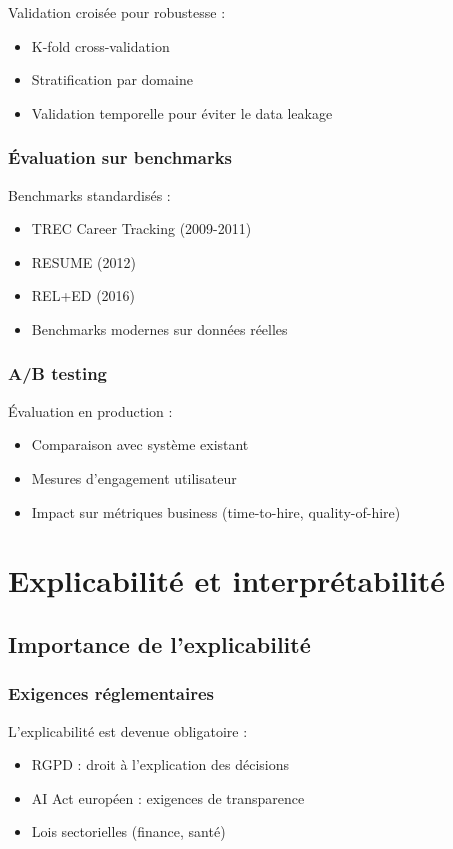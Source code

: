 \documentclass[12pt,a4paper]{report}
\begin{document}
Validation croisée pour robustesse :
\begin{itemize}
\item K-fold cross-validation
\item Stratification par domaine
\item Validation temporelle pour éviter le data leakage
\end{itemize}

\subsubsection{Évaluation sur benchmarks}

Benchmarks standardisés :
\begin{itemize}
\item TREC Career Tracking (2009-2011)
\item RESUME (2012)
\item REL+ED (2016)
\item Benchmarks modernes sur données réelles
\end{itemize}

\subsubsection{A/B testing}

Évaluation en production :
\begin{itemize}
\item Comparaison avec système existant
\item Mesures d'engagement utilisateur
\item Impact sur métriques business (time-to-hire, quality-of-hire)
\end{itemize}

\section{Explicabilité et interprétabilité}

\subsection{Importance de l'explicabilité}

\subsubsection{Exigences réglementaires}

L'explicabilité est devenue obligatoire :
\begin{itemize}
\item RGPD : droit à l'explication des décisions
\item AI Act européen : exigences de transparence
\item Lois sectorielles (finance, santé)
\end{itemize}
\end{document}
